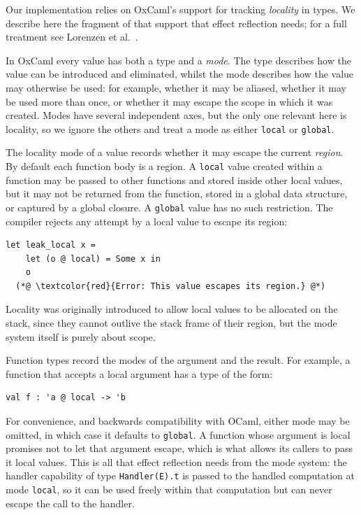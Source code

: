 \documentclass[acmsmall, screen, review, anonymous]{acmart}
\theoremstyle{definition}
\begin{document}
Our implementation relies on OxCaml's support for tracking
\emph{locality} in types. We describe here the fragment of that support
that effect reflection needs; for a full treatment see Lorenzen et
al.~\cite{lorenzen2024oxidizing}.

In OxCaml every value has both a type and a \emph{mode}. The type
describes how the value can be introduced and eliminated, whilst the
mode describes how the value may otherwise be used: for example,
whether it may be aliased, whether it may be used more than once, or
whether it may escape the scope in which it was created. Modes have
several independent axes, but the only one relevant here is locality,
so we ignore the others and treat a mode as either
\lstinline[style=oxcaml]{local} or \lstinline[style=oxcaml]{global}.

The locality mode of a value records whether it may escape the current
\emph{region}. By default each function body is a region. A
\lstinline[style=oxcaml]{local} value created within a function may be
passed to other functions and stored inside other local values, but it
may not be returned from the function, stored in a global data
structure, or captured by a global closure. A
\lstinline[style=oxcaml]{global} value has no such restriction. The
compiler rejects any attempt by a local value to escape its region:
\begin{lstlisting}[style=oxcaml]
  let leak_local x =
    let (o @ local) = Some x in
    o
  (*@ \textcolor{red}{Error: This value escapes its region.} @*)
\end{lstlisting}
Locality was originally introduced to allow local values to be
allocated on the stack, since they cannot outlive the stack frame of
their region, but the mode system itself is purely about scope.

Function types record the modes of the argument and the result. For
example, a function that accepts a local argument has a type of the
form:
\begin{lstlisting}[style=oxcaml]
  val f : 'a @ local -> 'b
\end{lstlisting}
For convenience, and backwards compatibility with OCaml, either mode
may be omitted, in which case it defaults to
\lstinline[style=oxcaml]{global}. A function whose argument is local
promises not to let that argument escape, which is what allows its
callers to pass it local values. This is all that effect reflection
needs from the mode system: the handler capability of type
\lstinline[style=oxcaml]{Handler(E).t} is passed to the handled
computation at mode \lstinline[style=oxcaml]{local}, so it can be used
freely within that computation but can never escape the call to the
handler.
\end{document}
